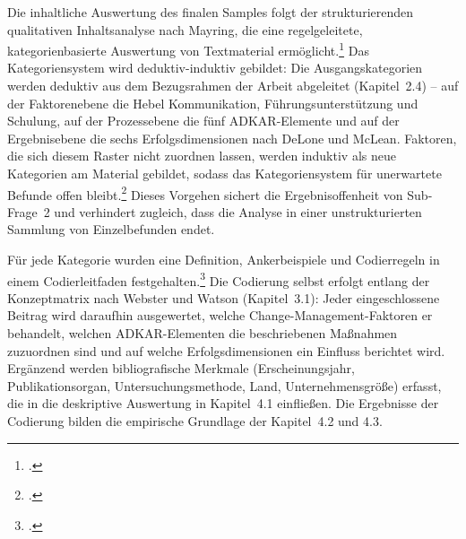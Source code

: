 Die inhaltliche Auswertung des finalen Samples folgt der strukturierenden qualitativen Inhaltsanalyse nach Mayring, die eine regelgeleitete, kategorienbasierte Auswertung von Textmaterial erm\"oglicht.\footcite[Vgl.][S.~97~ff.]{mayring2015} Das Kategoriensystem wird deduktiv-induktiv gebildet: Die Ausgangskategorien werden deduktiv aus dem Bezugsrahmen der Arbeit abgeleitet (Kapitel~2.4) -- auf der Faktorenebene die Hebel Kommunikation, F\"uhrungsunterst\"utzung und Schulung, auf der Prozessebene die f\"unf ADKAR-Elemente und auf der Ergebnisebene die sechs Erfolgsdimensionen nach DeLone und McLean. Faktoren, die sich diesem Raster nicht zuordnen lassen, werden induktiv als neue Kategorien am Material gebildet, sodass das Kategoriensystem f\"ur unerwartete Befunde offen bleibt.\footcite[Vgl.][S.~85--87]{mayring2015} Dieses Vorgehen sichert die Ergebnisoffenheit von Sub-Frage~2 und verhindert zugleich, dass die Analyse in einer unstrukturierten Sammlung von Einzelbefunden endet.

F\"ur jede Kategorie wurden eine Definition, Ankerbeispiele und Codierregeln in einem Codierleitfaden festgehalten.\footcite[Vgl.][S.~97--99]{mayring2015} Die Codierung selbst erfolgt entlang der Konzeptmatrix nach Webster und Watson (Kapitel~3.1): Jeder eingeschlossene Beitrag wird daraufhin ausgewertet, welche Change-Management-Faktoren er behandelt, welchen ADKAR-Elementen die beschriebenen Ma\ss{}nahmen zuzuordnen sind und auf welche Erfolgsdimensionen ein Einfluss berichtet wird. Erg\"anzend werden bibliografische Merkmale (Erscheinungsjahr, Publikationsorgan, Untersuchungsmethode, Land, Unternehmensgr\"o\ss{}e) erfasst, die in die deskriptive Auswertung in Kapitel~4.1 einflie\ss{}en. Die Ergebnisse der Codierung bilden die empirische Grundlage der Kapitel~4.2 und 4.3.
